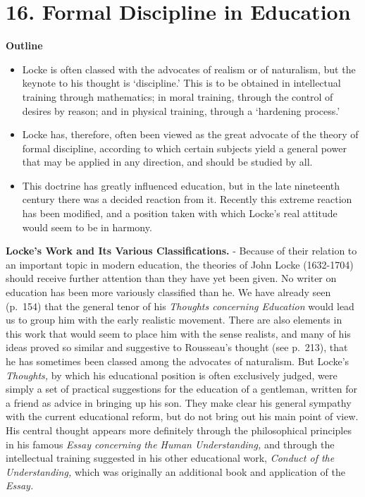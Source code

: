 \documentclass[
]{book}
\providecommand{\tightlist}{%
  \setlength{\itemsep}{0pt}\setlength{\parskip}{0pt}}
\begin{document}
\hypertarget{formal-discipline-in-education}{%
\chapter{16. Formal Discipline in Education}\label{formal-discipline-in-education}}

\textbf{Outline}

\begin{itemize}
\tightlist
\item
  Locke is often classed with the advocates of realism or of naturalism, but the keynote to his thought is `discipline.' This is to be obtained in intellectual training through mathematics; in moral training, through the control of desires by reason; and in physical training, through a `hardening process.'
\item
  Locke has, therefore, often been viewed as the great advocate of the theory of formal discipline, according to which certain subjects yield a general power that may be applied in any direction, and should be studied by all.
\item
  This doctrine has greatly influenced education, but in the late nineteenth century there was a decided reaction from it. Recently this extreme reaction has been modified, and a position taken with which Locke's real attitude would seem to be in harmony.
\end{itemize}

\textbf{Locke's Work and Its Various Classifications.} - Because of their relation to an important topic in modern education, the theories of John Locke (1632-1704) should receive further attention than they have yet been given. No writer on education has been more variously classified than he. We have already seen (p.~154) that the general tenor of his \emph{Thoughts concerning Education} would lead us to group him with the early realistic movement. There are also elements in this work that would seem to place him with the sense realists, and many of his ideas proved so similar and suggestive to Rousseau's thought (see p.~213), that he has sometimes been classed among the advocates of naturalism. But Locke's \emph{Thoughts,} by which his educational position is often exclusively judged, were simply a set of practical suggestions for the education of a gentleman, written for a friend as advice in bringing up his son. They make clear his general sympathy with the current educational reform, but do not bring out his main point of view. His central thought appears more definitely through the philosophical principles in his famous \emph{Essay concerning the Human Understanding,} and through the intellectual training suggested in his other educational work, \emph{Conduct of the Understanding,} which was originally an additional book and application of the \emph{Essay.}
\end{document}

